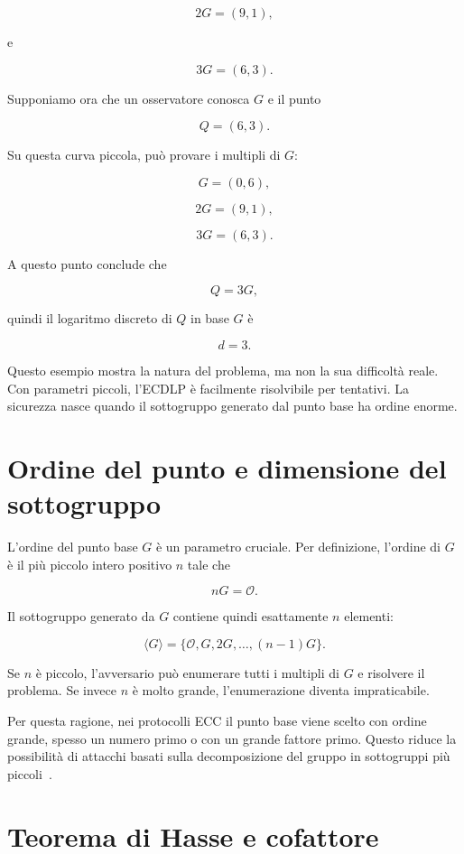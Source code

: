 \documentclass[12pt,a4paper,oneside]{report}
\begin{document}
\[
2G = (9,1),
\]

e

\[
3G = (6,3).
\]

Supponiamo ora che un osservatore conosca \(G\) e il punto

\[
Q=(6,3).
\]

Su questa curva piccola, può provare i multipli di \(G\):

\[
G=(0,6),
\]

\[
2G=(9,1),
\]

\[
3G=(6,3).
\]

A questo punto conclude che

\[
Q=3G,
\]

quindi il logaritmo discreto di \(Q\) in base \(G\) è

\[
d=3.
\]

Questo esempio mostra la natura del problema, ma non la sua difficoltà reale. Con parametri piccoli, l'ECDLP è facilmente risolvibile per tentativi. La sicurezza nasce quando il sottogruppo generato dal punto base ha ordine enorme.

\section{Ordine del punto e dimensione del sottogruppo}

L'ordine del punto base \(G\) è un parametro cruciale. Per definizione, l'ordine di \(G\) è il più piccolo intero positivo \(n\) tale che

\begin{equation}
    nG = \mathcal{O}.
\end{equation}

Il sottogruppo generato da \(G\) contiene quindi esattamente \(n\) elementi:

\[
\langle G \rangle = \{ \mathcal{O}, G, 2G, \ldots, (n-1)G \}.
\]

Se \(n\) è piccolo, l'avversario può enumerare tutti i multipli di \(G\) e risolvere il problema. Se invece \(n\) è molto grande, l'enumerazione diventa impraticabile.

Per questa ragione, nei protocolli ECC il punto base viene scelto con ordine grande, spesso un numero primo o con un grande fattore primo. Questo riduce la possibilità di attacchi basati sulla decomposizione del gruppo in sottogruppi più piccoli~\cite{margara_ec,sec1}.

\section{Teorema di Hasse e cofattore}
\end{document}
